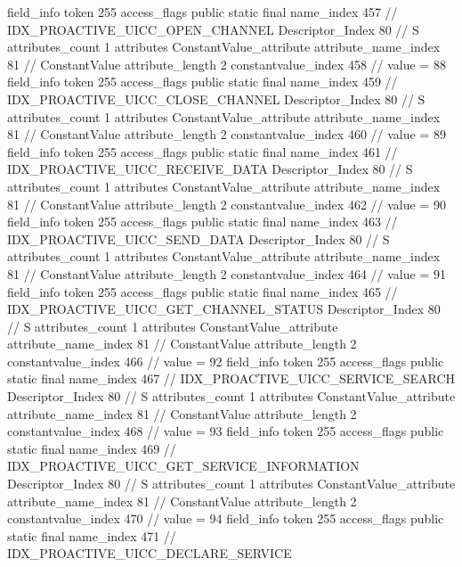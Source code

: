 {{{{{{{				}
				}
			}
			field_info {
				token	255
				access_flags	public static final
				name_index	457		// IDX_PROACTIVE_UICC_OPEN_CHANNEL
				Descriptor_Index	80		// S
				attributes_count	1
				attributes {
				ConstantValue_attribute {
					attribute_name_index	81		// ConstantValue
					attribute_length	2
					constantvalue_index	458		// value = 88
				}
				}
			}
			field_info {
				token	255
				access_flags	public static final
				name_index	459		// IDX_PROACTIVE_UICC_CLOSE_CHANNEL
				Descriptor_Index	80		// S
				attributes_count	1
				attributes {
				ConstantValue_attribute {
					attribute_name_index	81		// ConstantValue
					attribute_length	2
					constantvalue_index	460		// value = 89
				}
				}
			}
			field_info {
				token	255
				access_flags	public static final
				name_index	461		// IDX_PROACTIVE_UICC_RECEIVE_DATA
				Descriptor_Index	80		// S
				attributes_count	1
				attributes {
				ConstantValue_attribute {
					attribute_name_index	81		// ConstantValue
					attribute_length	2
					constantvalue_index	462		// value = 90
				}
				}
			}
			field_info {
				token	255
				access_flags	public static final
				name_index	463		// IDX_PROACTIVE_UICC_SEND_DATA
				Descriptor_Index	80		// S
				attributes_count	1
				attributes {
				ConstantValue_attribute {
					attribute_name_index	81		// ConstantValue
					attribute_length	2
					constantvalue_index	464		// value = 91
				}
				}
			}
			field_info {
				token	255
				access_flags	public static final
				name_index	465		// IDX_PROACTIVE_UICC_GET_CHANNEL_STATUS
				Descriptor_Index	80		// S
				attributes_count	1
				attributes {
				ConstantValue_attribute {
					attribute_name_index	81		// ConstantValue
					attribute_length	2
					constantvalue_index	466		// value = 92
				}
				}
			}
			field_info {
				token	255
				access_flags	public static final
				name_index	467		// IDX_PROACTIVE_UICC_SERVICE_SEARCH
				Descriptor_Index	80		// S
				attributes_count	1
				attributes {
				ConstantValue_attribute {
					attribute_name_index	81		// ConstantValue
					attribute_length	2
					constantvalue_index	468		// value = 93
				}
				}
			}
			field_info {
				token	255
				access_flags	public static final
				name_index	469		// IDX_PROACTIVE_UICC_GET_SERVICE_INFORMATION
				Descriptor_Index	80		// S
				attributes_count	1
				attributes {
				ConstantValue_attribute {
					attribute_name_index	81		// ConstantValue
					attribute_length	2
					constantvalue_index	470		// value = 94
				}
				}
			}
			field_info {
				token	255
				access_flags	public static final
				name_index	471		// IDX_PROACTIVE_UICC_DECLARE_SERVICE
}}}}}
